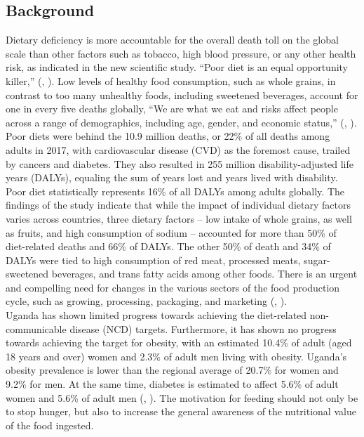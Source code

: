 \documentclass {article}
\begin{document}
\subsection{Background}
\label{Background}
\noindent Dietary deficiency is more accountable for the overall death toll on the global scale than other factors such as tobacco, high blood pressure, or any other health risk, as indicated in the new scientific study. “Poor diet is an equal opportunity killer,” (\citeauthor{ihme2019new}, \citeyear{ihme2019new}). Low levels of healthy food consumption, such as whole grains, in contrast to too many unhealthy foods, including sweetened beverages, account for one in every five deaths globally, “We are what we eat and risks affect people across a range of demographics, including age, gender, and economic status,” (\citeauthor{ihme2019new}, \citeyear{ihme2019new}).\\

\noindent Poor diets were behind the 10.9 million deaths, or 22\% of all deaths among adults in 2017, with cardiovascular disease (CVD) as the foremost cause, trailed by cancers and diabetes. They also resulted in 255 million disability-adjusted life years (DALYs), equaling the sum of years lost and years lived with disability. Poor diet statistically represents 16\% of all DALYs among adults globally. The findings of the study indicate that while the impact of individual dietary factors varies across countries, three dietary factors – low intake of whole grains, as well as fruits, and high consumption of sodium – accounted for more than 50\% of diet-related deaths and 66\% of DALYs. The other 50\% of death and 34\% of DALYs were tied to high consumption of red meat, processed meats, sugar-sweetened beverages, and trans fatty acids among other foods. There is an urgent and compelling need for changes in the various sectors of the food production cycle, such as growing, processing, packaging, and marketing (\citeauthor{ihme2019new}, \citeyear{ihme2019new}).\\

\noindent Uganda has shown limited progress towards achieving the diet-related non-communicable disease (NCD) targets. Furthermore, it has shown no progress towards achieving the target for obesity, with an estimated 10.4\% of adult (aged 18 years and over) women and 2.3\% of adult men living with obesity. Uganda's obesity prevalence is lower than the regional average of 20.7\% for women and 9.2\% for men. At the same time, diabetes is estimated to affect 5.6\% of adult women and 5.6\% of adult men (\citeauthor{globalnutritionreportn.d.}, \citeyear{globalnutritionreportn.d.}). The motivation for feeding should not only be to stop hunger, but also to increase the general awareness of the nutritional value of the food ingested.
\end{document}
